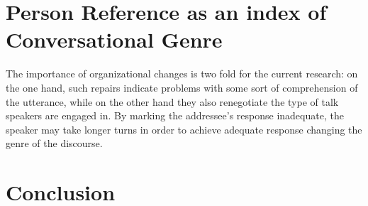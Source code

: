 \documentclass[12pt, draft]{article}
\begin{document}
\section{Person Reference as an index of Conversational Genre}
The importance of organizational changes is two fold for the current research: on the one hand, such repairs indicate problems with some sort of comprehension of the utterance, while on the other hand they also renegotiate the type of talk speakers are engaged in. By marking the addressee's response inadequate, the speaker may take longer turns in order to achieve adequate response changing the genre of the discourse.
\section{Conclusion}

\printbibliography
\end{document}
